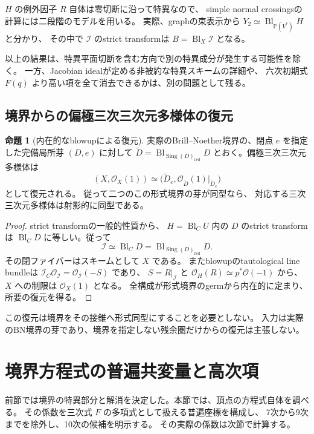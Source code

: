 \documentclass[a4paper,11pt]{ltjsarticle}
\theoremstyle{definition}
\newtheorem{theorem}{命題}[section]
\newcommand{\OO}{\mathcal O}
\newcommand{\PP}{\mathbb P}
\begin{document}
$H$ の例外因子 $R$ 自体は零切断に沿って特異なので、
simple normal crossingsの計算には二段階のモデルを用いる。
実際、graphの束表示から $Y_2\simeq\operatorname{Bl}_{\PP(V^*)}H$ と分かり、
その中で $\mathcal I$ のstrict transformは $B=\operatorname{Bl}_X\mathcal I$ となる。

以上の結果は、特異平面切断を含む方向で別の特異成分が発生する可能性を除く。
一方、Jacobian idealが定める非被約な特異スキームの詳細や、
六次初期式 $F(q)$ より高い項を全て消去できるかは、別の問題として残る。


\subsection{境界からの偏極三次三次元多様体の復元}

\begin{theorem}[内在的なblowupによる復元]\label{thm:bn-intrinsic-reconstruction}
実際のBrill--Noether境界の、閉点 $e$ を指定した完備局所芽 $(D,e)$ に対して
$\widetilde D=\operatorname{Bl}_{\operatorname{Sing}(D)_{\mathrm{red}}}D$
とおく。偏極三次三次元多様体は
\[
 (X,\OO_X(1))
 \simeq\bigl(\widetilde D_e,\OO_{\widetilde D}(1)|_{\widetilde D_e}\bigr)
\]
として復元される。
従って二つのこの形式境界の芽が同型なら、
対応する三次三次元多様体は射影的に同型である。
\end{theorem}

\begin{proof}
strict transformの一般的性質\cite{StacksStrictTransform}から、
$H=\operatorname{Bl}_C U$ 内の $D$ のstrict transformは
$\operatorname{Bl}_C D$ に等しい。従って
\[
 \mathcal I\simeq\operatorname{Bl}_C D
 =\operatorname{Bl}_{\operatorname{Sing}(D)_{\mathrm{red}}}D.
\]
その閉ファイバーはスキームとして $X$ である。
またblowupのtautological line bundleは
$\mathcal I_C\OO_{\mathcal I}=\OO_{\mathcal I}(-S)$ であり、
$S=R|_{\mathcal I}$ と $\OO_H(R)\simeq p^*\OO(-1)$ から、
$X$ への制限は $\OO_X(1)$ となる。
全構成が形式境界のgermから内在的に定まり、所要の復元を得る。
\end{proof}

この復元は境界をその接錐へ形式同型にすることを必要としない。
入力は実際のBN境界の芽であり、境界を指定しない残余圏だけからの復元は主張しない。


\section{境界方程式の普遍共変量と高次項}
\label{sec:boundary-higher-jets}

前節では境界の特異部分と解消を決定した。本節では、頂点の方程式自体を調べる。
その係数を三次式 $F$ の多項式として扱える普遍座標を構成し、
7次から9次までを除外し、10次の候補を明示する。
その実際の係数は次節で計算する。
\end{document}
